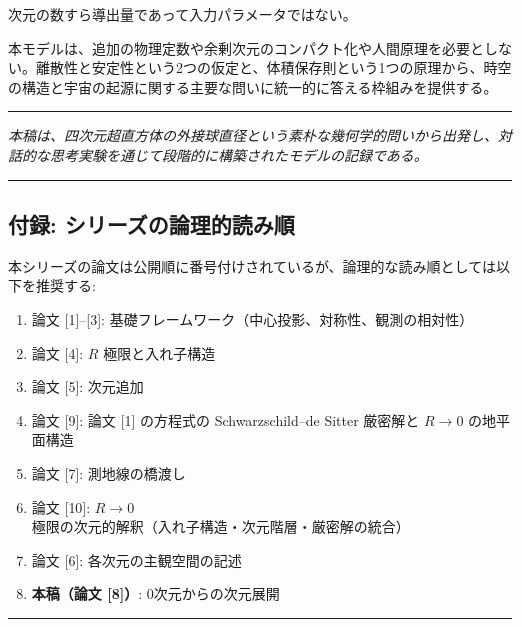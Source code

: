 \documentclass[a4paper,11pt]{ltjsarticle}
\theoremstyle{definition}
\providecommand{\tightlist}{\setlength{\itemsep}{0pt}\setlength{\parskip}{0pt}}
\begin{document}
次元の数すら導出量であって入力パラメータではない。

本モデルは、追加の物理定数や余剰次元のコンパクト化や人間原理を必要としない。離散性と安定性という2つの仮定と、体積保存則という1つの原理から、時空の構造と宇宙の起源に関する主要な問いに統一的に答える枠組みを提供する。

\begin{center}\rule{0.5\linewidth}{0.5pt}\end{center}

\emph{本稿は、四次元超直方体の外接球直径という素朴な幾何学的問いから出発し、対話的な思考実験を通じて段階的に構築されたモデルの記録である。}

\begin{center}\rule{0.5\linewidth}{0.5pt}\end{center}

\subsection{付録:
シリーズの論理的読み順}\label{ux4ed8ux9332-ux30b7ux30eaux30fcux30baux306eux8ad6ux7406ux7684ux8aadux307fux9806}

本シリーズの論文は公開順に番号付けされているが、論理的な読み順としては以下を推奨する:

\begin{enumerate}
\def\labelenumi{\arabic{enumi}.}
\tightlist
\item
  論文 {[}1{]}--{[}3{]}:
  基礎フレームワーク（中心投影、対称性、観測の相対性）
\item
  論文 {[}4{]}: \(R\) 極限と入れ子構造
\item
  論文 {[}5{]}: 次元追加
\item
  論文 {[}9{]}: 論文 {[}1{]} の方程式の Schwarzschild--de Sitter
  厳密解と \(R \to 0\) の地平面構造
\item
  論文 {[}7{]}: 測地線の橋渡し
\item
  論文 {[}10{]}: \(R \to 0\)
  極限の次元的解釈（入れ子構造・次元階層・厳密解の統合）
\item
  論文 {[}6{]}: 各次元の主観空間の記述
\item
  \textbf{本稿（論文 {[}8{]}）}: 0次元からの次元展開
\end{enumerate}

\begin{center}\rule{0.5\linewidth}{0.5pt}\end{center}
\end{document}
